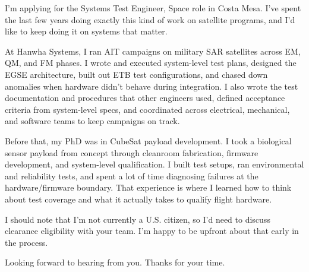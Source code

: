 \documentclass[letterpaper,11pt]{moderncv}
\date{\today}
\begin{document}
\makelettertitle

I'm applying for the Systems Test Engineer, Space role in Costa Mesa. I've spent the last few years doing exactly this kind of work on satellite programs, and I'd like to keep doing it on systems that matter.

At Hanwha Systems, I ran AIT campaigns on military SAR satellites across EM, QM, and FM phases. I wrote and executed system-level test plans, designed the EGSE architecture, built out ETB test configurations, and chased down anomalies when hardware didn't behave during integration. I also wrote the test documentation and procedures that other engineers used, defined acceptance criteria from system-level specs, and coordinated across electrical, mechanical, and software teams to keep campaigns on track.

Before that, my PhD was in CubeSat payload development. I took a biological sensor payload from concept through cleanroom fabrication, firmware development, and system-level qualification. I built test setups, ran environmental and reliability tests, and spent a lot of time diagnosing failures at the hardware/firmware boundary. That experience is where I learned how to think about test coverage and what it actually takes to qualify flight hardware.

I should note that I'm not currently a U.S. citizen, so I'd need to discuss clearance eligibility with your team. I'm happy to be upfront about that early in the process.

Looking forward to hearing from you. Thanks for your time.

\makeletterclosing
\end{document}
